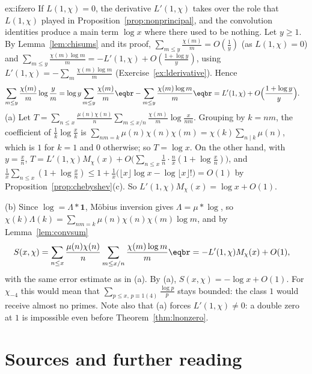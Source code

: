 \begin{solution}{ex:ifzero}
\idea If $L(1,\chi)=0$, the derivative $L'(1,\chi)$ takes over the role that $L(1,\chi)$ played in Proposition~\ref{prop:nonprincipal}, and the convolution identities produce a
main term $\log x$ where there used to be nothing.
\writeup Let $y\ge1$. By Lemma~\ref{lem:chisums} and its proof, $\sum_{m\le y}\frac{\chi(m)}m=O(\frac1y)$ (as $L(1,\chi)=0$) and $\sum_{m\le y}\frac{\chi(m)\log m}m=-L'(1,\chi)+O(\frac{1+\log y}y)$, using
$L'(1,\chi)=-\sum_m\frac{\chi(m)\log m}m$ (Exercise~\ref{ex:lderivative}). Hence
\[
\begin{aligned}\sum_{m\le y}\frac{\chi(m)}m\log\frac ym&=\log y\sum_{m\le y}\frac{\chi(m)}m\eqbr-\sum_{m\le y}\frac{\chi(m)\log m}m\eqbr=L'(1,\chi)+O\Bigl(\frac{1+\log y}y\Bigr).\end{aligned}
\]
(a) Let $T=\sum_{n\le x}\frac{\mu(n)\chi(n)}n\sum_{m\le x/n}\frac{\chi(m)}m\log\frac x{nm}$. Grouping by $k=nm$, the coefficient of $\frac1k\log\frac xk$ is $\sum_{nm=k}\mu(n)\chi(n)\chi(m)=\chi(k)\sum_{n\mid k}\mu(n)$,
which is $1$ for $k=1$ and $0$ otherwise; so $T=\log x$. On the other hand, with $y=\frac xn$, $T=L'(1,\chi)M_\chi(x)+O\bigl(\sum_{n\le x}\frac1n\cdot\frac nx(1+\log\frac xn)\bigr)$,
and $\frac1x\sum_{n\le x}(1+\log\frac xn)\le1+\frac1x\bigl(\lfloor x\rfloor\log x-\log\lfloor x\rfloor!\bigr)=O(1)$ by Proposition~\ref{prop:chebyshev}(c). So $L'(1,\chi)M_\chi(x)=\log x+O(1)$.

(b) Since $\log=\Lambda*\mathbf1$, Möbius inversion gives $\Lambda=\mu*\log$, so $\chi(k)\Lambda(k)=\sum_{nm=k}\mu(n)\chi(n)\chi(m)\log m$, and by Lemma~\ref{lem:convsum}
\[
\begin{aligned}S(x,\chi)&=\sum_{n\le x}\frac{\mu(n)\chi(n)}n\sum_{m\le x/n}\frac{\chi(m)\log m}m\eqbr=-L'(1,\chi)M_\chi(x)+O(1),\end{aligned}
\]
with the same error estimate as in (a). By (a), $S(x,\chi)=-\log x+O(1)$. For $\chi_{-4}$ this would mean that $\sum_{p\le x,\,p\equiv1(4)}\frac{\log p}p$ stays bounded: the class $1$ would
receive almost no primes. Note also that (a) forces $L'(1,\chi)\ne0$: a double zero at $1$ is impossible even before Theorem~\ref{thm:lnonzero}.
\end{solution}

\section*{Sources and further reading}

